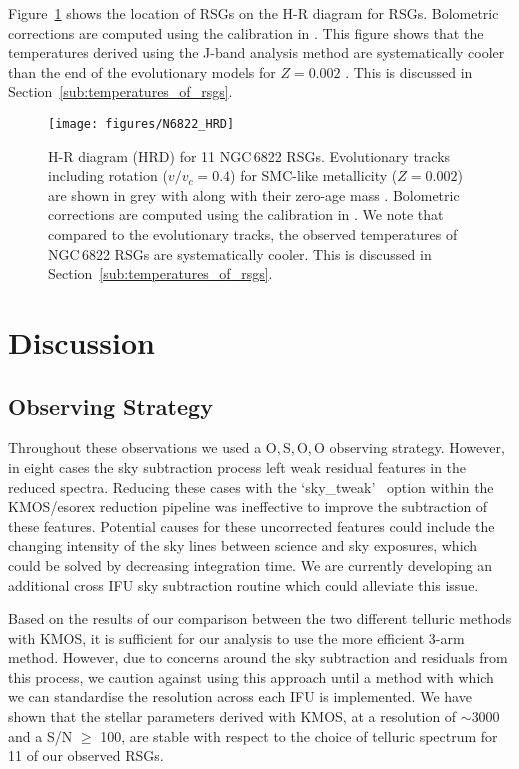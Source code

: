 \documentclass[iop]{emulateapj}
\begin{document}
Figure~\ref{fig:6822HRD} shows the location of RSGs on the H-R diagram for RSGs.
Bolometric corrections are computed using the calibration in
\cite{Davies13a}.
This figure shows that the temperatures derived using the J-band analysis method are systematically cooler than the end of the evolutionary models for
$Z=0.002$
\citep{2013A&A...558A.103G}.
This is discussed in Section~\ref{sub:temperatures_of_rsgs}.


\begin{figure}
\texttt{[image: figures/N6822\_HRD]}
\caption{
H-R diagram (HRD) for 11 NGC\,6822 RSGs.
Evolutionary tracks including rotation
($v/v_{c} = 0.4$) for SMC-like metallicity ($Z=0.002$) are shown in grey with
along with their zero-age mass
\protect\citep{2013A&A...558A.103G}.
Bolometric corrections are computed using the calibration in
\protect\cite{Davies13a}.
We note that compared to the evolutionary tracks,
the observed temperatures of NGC\,6822 RSGs are systematically cooler.
This is discussed in Section~\ref{sub:temperatures_of_rsgs}.
}
\label{fig:6822HRD}
\end{figure}



\section{Discussion} %
\label{sec:discussion}

\subsection{Observing Strategy} %
\label{sub:observing_strategy}

Throughout these observations we used a O,\,S,\,O,\,O observing strategy.
However, in eight cases the sky subtraction process left weak residual features in the reduced spectra.
Reducing these cases with the \textquoteleft sky\_tweak\textquoteright
~option within the KMOS/esorex reduction pipeline was ineffective to improve the subtraction of these features.
Potential causes for these uncorrected features could include the changing intensity of the sky lines between science and sky exposures,
which could be solved by decreasing integration time.
We are currently developing an additional cross IFU sky subtraction routine which could alleviate this issue.


Based on the results of our comparison between the two different telluric methods with KMOS,
it is sufficient for our analysis to use the more efficient 3-arm method.
However, due to concerns around the sky subtraction and residuals from this process,
we caution against using this approach until a method with which we can standardise the resolution across each IFU is implemented.
We have shown that the stellar parameters derived with KMOS,
at a resolution of $\sim$3000 and a S/N $\ge$ 100,
are stable with respect to the choice of telluric spectrum for 11 of our observed RSGs.
\end{document}
